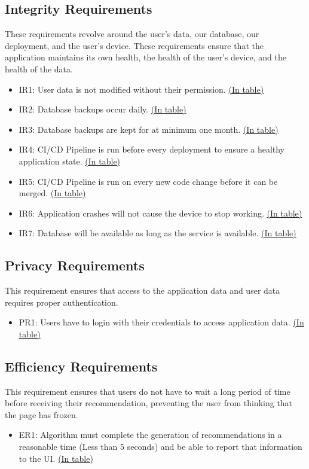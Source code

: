 \documentclass[12pt]{article}
\begin{document}
\subsection{Integrity Requirements}
These requirements revolve around the user's data, our database, our deployment, and the user's device. These requirements ensure that the application maintains its own health, the health of the user's device, and the health of the data.
\begin{itemize}
	\item IR1: User data is not modified without their permission. \hyperref[table1]{(In table)}
	\item IR2: Database backups occur daily. \hyperref[table1]{(In table)}
	\item IR3: Database backups are kept for at minimum one month. \hyperref[table1]{(In table)}
	\item IR4: CI/CD Pipeline is run before every deployment to ensure a healthy application state. \hyperref[table3]{(In table)}
	\item IR5: CI/CD Pipeline is run on every new code change before it can be merged. \hyperref[table3]{(In table)}
	\item IR6: Application crashes will not cause the device to stop working. \hyperref[table3]{(In table)}
	\item IR7: Database will be available as long as the service is available. \hyperref[table1]{(In table)}
\end{itemize}

\subsection{Privacy Requirements}
This requirement ensures that access to the application data and user data requires proper authentication.
\begin{itemize}
	\item PR1: Users have to login with their credentials to access application data. \hyperref[table1]{(In table)}
\end{itemize}

\subsection{Efficiency Requirements}
This requirement ensures that users do not have to wait a long period of time before receiving their recommendation, preventing the user from thinking that the page has frozen.
\begin{itemize}
	\item ER1: Algorithm must complete the generation of recommendations in a reasonable time (Less than 5 seconds) and be able to report that information to the UI. \hyperref[table2]{(In table)}
\end{itemize}
\end{document}
